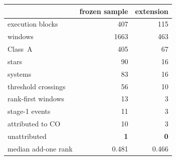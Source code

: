 \begin{tabular}{@{}lrr@{}}
\toprule
 & frozen sample & extension \\
\midrule
execution blocks & 407 & 115 \\
windows & 1663 & 463 \\
\quad Class~A & 405 & 67 \\
stars & 90 & 16 \\
systems & 83 & 16 \\
\midrule
threshold crossings & 56 & 10 \\
rank-first windows & 13 & 3 \\
stage-1 events & 11 & 3 \\
\quad attributed to CO & 10 & 3 \\
\quad unattributed & \textbf{1} & \textbf{0} \\
\midrule
median add-one rank & 0.481 & 0.466 \\
\bottomrule
\end{tabular}
